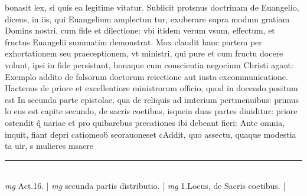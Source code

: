 \documentclass{article}
\begin{document}
\begin{pages}
bonasit lex, si quis ea legitime vitatur. Subiicit protsnus doctrinam de Euangelio, dicens, in iis, qui Euangelium amplectun tur, exuberare supra modum gratiam Domins nostri, cum fide et dilectione: vbi itidem verum vsum, effectum, et fructus Euangelii summatim demonstrat. Mox claudit hanc partem per exhortationem seu praeceptionem, vt ministri, qui pure et cum fructu docere volunt, ipsi in fide persistant, bonaque  cum conscientia negocium Christi agant: Exemplo addito de falsorum doctorum reiectione aut iusta excommunicatione.  \pend\pstart Hactenus de priore et excellentiore ministrorum officio, quod in docendo positum est In secunda parte epistolae, qua de reliquis ad imterium pertmenuibus: primus lo eus est capite secundo, de sacris coetibus, isquein duas partes diuiditur: priore ostendit q̃ uariae et pro quibarebus precationes ibi debeant fieri: Ante omnia, inquit, fiant depri catiomeob́ seorauoneset cAddit, quo assectu, quaque  modestia ta uir, s mulieres msacre  \pend
\vspace{0.5cm}\noindent
\vspace{0.2cm}\rule{1cm}{0.2pt}\\ 
\hspace{0.2cm}\textit{mg}
\footnotesize Act.16. 
\normalsize| 
\hspace{0.2cm}\textit{mg}
\footnotesize secunda partis distributio. 
\normalsize| 
\hspace{0.2cm}\textit{mg}
\footnotesize 1.Locus, de Sacris coetibus. 
\normalsize| 

\end{pages}
\end{document}
